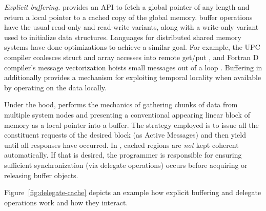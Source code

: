 \vspace{1ex}
\textit{Explicit buffering.} \Grappa provides an API to fetch a global pointer of
any length and return a local pointer to a cached copy of the global memory.
\Grappa buffer operations have the usual read-only and read-write variants,
along with a write-only variant used to initialize data structures. Languages
for distributed shared memory systems have done optimizations to achieve a
similar goal. For example, the UPC compiler coalesces struct and array
accesses into remote get/put \cite{Chen:2005}, and Fortran D compiler's
message vectorization hoists small messages out of a loop
\cite{FortranD:1992}. Buffering in \Grappa additionally provides a mechanism for
exploiting temporal locality when available by operating on the data locally.

Under the hood, \Grappa performs the mechanics of gathering chunks of data from
multiple system nodes and presenting a conventional appearing linear block of
memory as a local pointer into a buffer. The strategy employed is to issue all
the constituent requests of the desired block (as Active Messages) and then
yield until all responses have occurred. In \Grappa, cached regions are
\emph{not\/} kept coherent automatically. If that is desired, the programmer is
responsible for ensuring sufficient synchronization (via delegate operations)
occurs before acquiring or releasing buffer objects.

Figure~\ref{fig:delegate-cache} depicts an example how explicit
buffering and
delegate operations work and how they interact.


